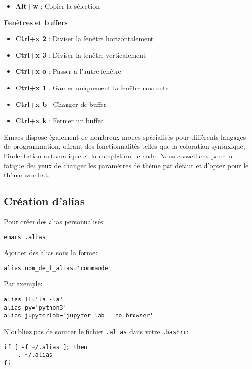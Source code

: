 \documentclass[10pt]{book}
\begin{document}
\begin{appendices}
\begin{minipage}[t]{.46\linewidth}
\begin{itemize}
\item \textbf{Alt+w} : Copier la sélection
\end{itemize}
\end{minipage}\hfill
\begin{minipage}[t]{.52\linewidth}
\textbf{Fenêtres et buffers}
\begin{itemize}
\item \textbf{Ctrl+x 2} : Diviser la fenêtre horizontalement
\item \textbf{Ctrl+x 3} : Diviser la fenêtre verticalement
\item \textbf{Ctrl+x o} : Passer à l'autre fenêtre
\item \textbf{Ctrl+x 1} : Garder uniquement la fenêtre courante
\item \textbf{Ctrl+x b} : Changer de buffer
\item \textbf{Ctrl+x k} : Fermer un buffer
\end{itemize}
\end{minipage}
Emacs dispose également de nombreux modes spécialisés pour différents langages de programmation, offrant des fonctionnalités telles que la coloration syntaxique, l'indentation automatique et la complétion de code. Nous conseillons pour la fatigue des yeux de changer les paramètres de thème par défaut et d'opter pour le thème wombat.
\subsection{Création d'alias}
Pour créer des alias personnalisés:
\begin{verbatim}
emacs .alias
\end{verbatim}
Ajouter des alias sous la forme:
\begin{verbatim}
alias nom_de_l_alias='commande'
\end{verbatim}
Par exemple:
\begin{verbatim}
alias ll='ls -la'
alias py='python3'
alias jupyterlab='jupyter lab --no-browser'
\end{verbatim}
N'oubliez pas de sourcer le fichier \texttt{.alias} dans votre \texttt{.bashrc}:
\begin{verbatim}
if [ -f ~/.alias ]; then
    . ~/.alias
fi
\end{verbatim}
\end{appendices}
\end{document}
